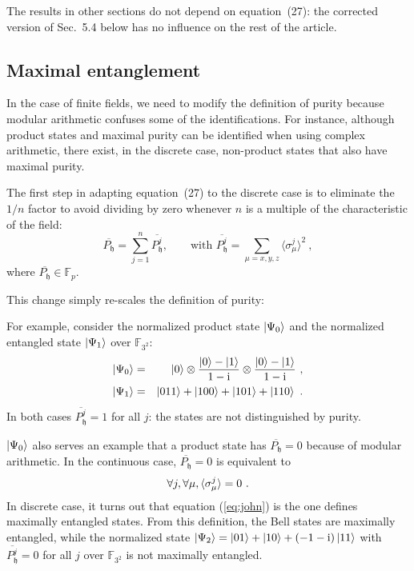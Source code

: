 \documentclass{iopart}
\newcommand{\ComplexI}{\text{i}}
\newcommand{\ff}[1]{\mathbb{F}_{#1}}
\def\fh{\mathfrak{h}}
\begin{document}
\bigskip The results in other sections do not depend on equation~(27): the corrected version of Sec.~5.4 below has no influence on the rest of the article. 

\subsection{Maximal entanglement}

In the case of finite fields, we need to modify the definition of purity because modular arithmetic confuses some of the identifications. For instance, although product states and maximal purity can be identified when using complex arithmetic, there exist, in the discrete case, non-product states that also have maximal purity. 

The first step in adapting equation~(27) to the discrete case is to eliminate the $1/n$ factor to avoid dividing by zero whenever $n$ is a multiple of the characteristic of the field:
\begin{equation}
\overline{P_{\fh}}=\sum\limits _{j=1}^{n}\overline{P_{\fh}^{j}}, \qquad\mbox{with~}
\overline{P_{\fh}^j} = \sum\limits _{\mu=x,y,z}\langle\sigma_{\mu}^{j}\rangle^{2}\ ,
\end{equation}
where $\overline{P_{\fh}}\in\ff{p}$. 

This change simply re-scales the definition of purity: 


For example, consider the normalized product state $\ket{\Psi_{0}}$ and the normalized entangled 
state $\ket{\Psi_{1}}$ over $\ff{3^{2}}$: 
\begin{eqnarray}
\ket{\Psi_{0}} & = & \ket{0}\otimes\frac{\ket{0}-\ket{1}}{1-\ComplexI}\otimes\frac{\ket{0}-\ket{1}}{1-\ComplexI}\ ,\\
\ket{\Psi_{1}} & = & \ket{011}+\ket{100}+\ket{101}+\ket{110}\ .
\end{eqnarray}
In both cases $\overline{P_{\fh}^j} = 1$ for all $j$: the states are not distinguished by purity. 

$\ket{\Psi_{0}}$ also serves an example that a product state has
$\overline{P_{\fh}}=0$ because of modular arithmetic. In the continuous
case, $\overline{P_{\fh}}=0$ is equivalent to 
\begin{equation}
\forall j,\forall\mu,\braket{\sigma_{\mu}^{j}}=0\ .\label{eq:john}
\end{equation}
In discrete case, it turns out that equation (\ref{eq:john}) is the
one defines maximally entangled states. From this definition, the
Bell states are maximally entangled, while the normalized state $\ket{\Psi_{2}}=\ket{01}+\ket{10}+\left(-1-\ComplexI\right)\ket{11}$
with $\overline{P_{\fh}^{j}}=0$ for all $j$ over $\ff{3^{2}}$ is
not maximally entangled.
\end{document}
